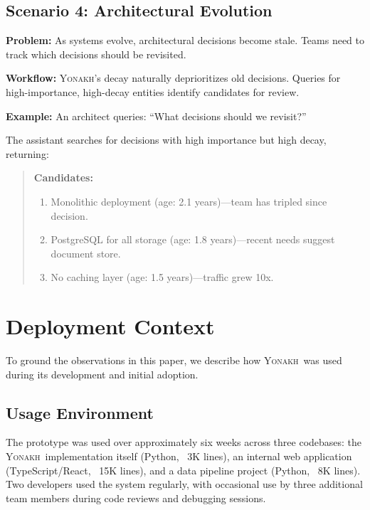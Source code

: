 \documentclass[10pt,journal,compsoc]{IEEEtran}
\newcommand{\yonakh}{\textsc{Yonakh}}
\begin{document}
\subsection{Scenario 4: Architectural Evolution}

\textbf{Problem:} As systems evolve, architectural decisions become stale. Teams need to track which decisions should be revisited.

\textbf{Workflow:} \yonakh's decay naturally deprioritizes old decisions. Queries for high-importance, high-decay entities identify candidates for review.

\textbf{Example:} An architect queries: ``What decisions should we revisit?''

The assistant searches for decisions with high importance but high decay, returning:

\begin{quote}
\textbf{Candidates:}
\begin{enumerate}
\item Monolithic deployment (age: 2.1 years)---team has tripled since decision.
\item PostgreSQL for all storage (age: 1.8 years)---recent needs suggest document store.
\item No caching layer (age: 1.5 years)---traffic grew 10x.
\end{enumerate}
\end{quote}

\section{Deployment Context}

To ground the observations in this paper, we describe how \yonakh\ was used during its development and initial adoption.

\subsection{Usage Environment}

The prototype was used over approximately six weeks across three codebases: the \yonakh\ implementation itself (Python, ~3K lines), an internal web application (TypeScript/React, ~15K lines), and a data pipeline project (Python, ~8K lines). Two developers used the system regularly, with occasional use by three additional team members during code reviews and debugging sessions.
\end{document}
